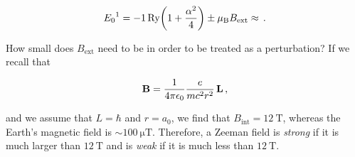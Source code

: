 \documentclass[12pt, titlepage]{article}
\begin{document}
\begin{equation*}
	{E_0}^1 = -\SI{1}{Ry}\qty(1+\frac{\alpha^2}{4}) \pm \mu_\text{B}B_\text{ext} \approx \,.
\end{equation*}

How small does $B_\text{ext}$ need to be in order to be treated as a perturbation? If we recall that

\begin{equation*}
	\vb{B} = \frac{1}{4\pi\epsilon_0}\frac{e}{mc^2r^2}\,\vb{L} \,,
\end{equation*}

and we assume that $L = \hbar$ and $r = a_0$, we find that $B_\text{int} = \SI{12}{\tesla}$, whereas the Earth's magnetic field is $\sim\SI{100}{\micro\tesla}$. Therefore, a Zeeman field is \emph{strong} if it is much larger than $\SI{12}{\tesla}$ and is \emph{weak} if it is much less than $\SI{12}{\tesla}$.
\end{document}

